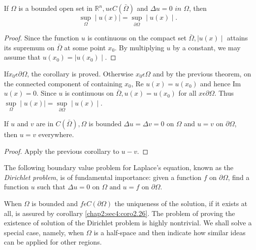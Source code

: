 \setcounter{coro}{24}
\begin{coro}\label{chap2:sec4:coro2.25}%
  If $\Omega$ is a bounded open set in $\mathbb{R}^n, u
  \epsilon C (\bar{\Omega})$ and $\Delta u=0 \textit{ in }
  \Omega$, then   
  $$
  \sup\limits_{\Omega}\mid u(x) \mid = \sup\limits_{\partial \Omega} \mid u(x)\mid. 
  $$
\end{coro}

\begin{proof}%
  Since the function $u$ is continuous on the compact set
  $\bar{\Omega}, \mid u(x)\mid$ attains its supremum on $\bar{\Omega}$ at
  some point $x_0$. By multiplying $u$ by a constant, we may assume
  that $u(x_0)=\mid u(x_0)\mid$.  
\end{proof}

If\pageoriginale $x_0 \epsilon \partial \Omega$, the corollary is
proved. Otherwise $x_0\epsilon \Omega$ and by the previous theorem,
on the connected component of containing $x_0$, Re $u(x)= u(x_0)$ and
hence Im $u(x)=0$. Since $u$ is continuous on $\bar{\Omega},
u(x)=u(x_0)$ for all $x\epsilon \partial \Omega$. Thus
$\sup\limits_{\Omega}\mid u(x)\mid = \sup\limits_{\partial \Omega}
\mid u(x)\mid $. 

\setcounter{coro}{25}
\begin{coro} \label{chap2:sec4:coro2.26}%
  If $u$ and  $v$  are in $C (\bar{\Omega}), \Omega$ 
  is bounded  $\Delta u= \Delta v= 0$ on  $\Omega$ and 
  $u=v$  on  $\partial \Omega$, then  $u=v$ everywhere. 
\end{coro}

\begin{proof}
  Apply the previous corollary to $u-v$.
\end{proof}

The following boundary value problem for Laplace's equation, \break known as
the \textit{Dirichlet problem}, is of fundamental importance: 
given a function $f$ on $\partial \Omega$, find a function $u$ such
that $\Delta u=0 \text{ on }\Omega \text{ and } u=f \text { on }
\partial \Omega$. 

When $\Omega$ is bounded and $f \epsilon C(\partial \Omega)$ the
uniqueness of the solution, if it exists at all, is assured by
corollary \ref{chap2:sec4:coro2.26}. The problem of proving the
existence of solution of 
the Dirichlet problem is highly nontrivial. We shall solve a special
case, namely, when $\Omega$ is a half-space and then indicate how
similar ideas can be applied for other regions. 

